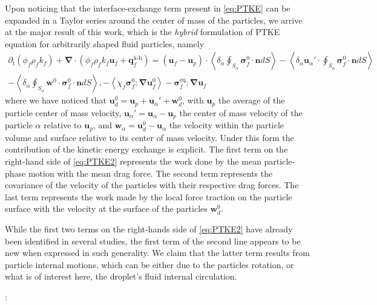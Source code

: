 \documentclass[12pt,a4paper]{article}
\newcommand{\avg}[1]{\left<#1\right>}
\renewcommand{\avg}[1]{\left<#1\right>}
\newcommand{\pavg}[1]{\avg{\delta_\alpha #1}}
\newcommand{\grad}{\mathbf{\nabla}}
\renewcommand{\div}{\mathbf{\nabla}\cdot}
\newcommand{\pddt}{\frac{\partial}{\partial t}}
\renewcommand{\pddt}{\partial_t}
\newcommand{\intS}[1]{\oint_{S_\alpha} #1 dS}
\newcommand{\pSavg}[1]{\pavg{\intS{#1}}}
\begin{document}
Upon noticing that the interface-exchange term present in \eqref{eq:PTKE} can be expanded in a Taylor series around the center of mass of the particles, we arrive at the major result of this work, which is the \textit{hybrid} formulation of PTKE equation for arbitrarily shaped fluid particles, namely
\begin{align}
    \pddt (\phi_f\rho_fk_f)  
    + \div (
        \phi_f\rho_fk_f\textbf{u}_f
        + \textbf{q}_f^\text{k-h} 
        )
    = 
    (\textbf{u}_f - \textbf{u}_p)\cdot \pSavg{{\bm{\sigma}_f^0 \cdot \textbf{n}}} 
    - \pavg{ \textbf{u}_\alpha' \cdot \intS{  \bm{\sigma}_f^0 \cdot \textbf{n}}}\nonumber\\
    - \pavg{ \intS{\textbf{w}^0 \cdot \bm{\sigma}_f^0 \cdot \textbf{n}}},
    - \avg{\chi_f\bm{\sigma}_f^0 : \grad \textbf{u}_f^0}
    - \bm{\sigma}_f^\text{eq} : \grad \textbf{u}_f
    \label{eq:PTKE2}
\end{align}
where we have noticed that $\textbf{u}_d^0 = \textbf{u}_p + \textbf{u}_\alpha' +\textbf{w}_d^0$, with $\textbf{u}_p$ the average of the particle center of mass velocity, $\textbf{u}_\alpha' = \textbf{u}_\alpha - \textbf{u}_p$ the center of mass velocity of the particle $\alpha$ relative to $\textbf{u}_p$, and $\textbf{w}_\alpha = \textbf{u}_d^0 - \textbf{u}_\alpha$ the velocity within the particle volume and surface relative to its center of mass velocity. 
Under this form the contribution of the kinetic energy exchange is explicit. 
The first term on the right-hand side of \eqref{eq:PTKE2} represents the work done by the mean particle-phase motion with the mean drag force.
The second term represents the covariance of the velocity of the particles with their respective drag forces.
The last term represents the work made by the local force traction on the particle surface with the velocity at the surface of the particles $\textbf{w}_d^0$.

While the first two terms on the right-hands side of \eqref{eq:PTKE2} have already been identified in several studies, the first term of the second line appears to be new when expressed in such generality.
We claim that the latter term results from particle internal motions, which can be either due to the particles rotation, or what is of interest here, the droplet's fluid internal circulation. 

\vspace{10pt}

:
\end{document}
